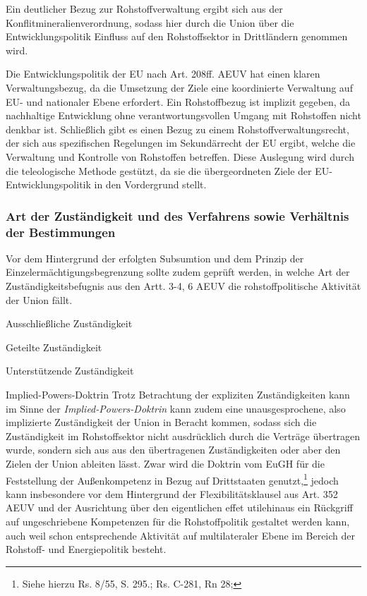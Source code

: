 \documentclass[12pt,a4paper,oneside]{book} %
\begin{document}
Ein deutlicher Bezug zur Rohstoffverwaltung ergibt sich aus der Konflitmineralienverordnung, sodass hier durch die Union über die Entwicklungspolitik Einfluss auf den Rohstoffsektor in Drittländern genommen wird.
	
Die Entwicklungspolitik der EU nach Art. 208ff. AEUV hat einen klaren Verwaltungsbezug, da die Umsetzung der Ziele eine koordinierte Verwaltung auf EU- und nationaler Ebene erfordert. Ein Rohstoffbezug ist implizit gegeben, da nachhaltige Entwicklung ohne verantwortungsvollen Umgang mit Rohstoffen nicht denkbar ist. Schließlich gibt es einen Bezug zu einem Rohstoffverwaltungsrecht, der sich aus spezifischen Regelungen im Sekundärrecht der EU ergibt, welche die Verwaltung und Kontrolle von Rohstoffen betreffen. Diese Auslegung wird durch die teleologische Methode gestützt, da sie die übergeordneten Ziele der EU-Entwicklungspolitik in den Vordergrund stellt.
	
\subsubsection{Art der Zuständigkeit und des Verfahrens sowie Verhältnis der Bestimmungen}

Vor dem Hintergrund der erfolgten Subsumtion und dem Prinzip der Einzelermächtigungsbegrenzung sollte zudem geprüft werden, in welche Art der Zuständigkeitsbefugnis aus den Artt. 3-4, 6 AEUV die rohstoffpolitische Aktivität der Union fällt.
	
Ausschließliche Zuständigkeit
	
Geteilte Zuständigkeit
	
Unterstützende Zuständigkeit
	
Implied-Powers-Doktrin
Trotz Betrachtung der expliziten Zuständigkeiten kann im Sinne der \textit{Implied-Powers-Doktrin} kann zudem eine unausgesprochene, also implizierte Zuständigkeit der Union in Beracht kommen, sodass sich die Zuständigkeit im Rohstoffsektor nicht ausdrücklich durch die Verträge übertragen wurde, sondern sich aus aus den übertragenen Zuständigkeiten oder aber den Zielen der Union ableiten lässt. Zwar wird die Doktrin vom EuGH für die Feststellung der Außenkompetenz in Bezug auf Drittstaaten genutzt,\footnote{Siehe hierzu Rs. 8/55, S. 295.; Rs. C-281, Rn 28; } jedoch kann insbesondere vor dem Hintergrund der Flexibilitätsklausel aus Art. 352 AEUV und der Ausrichtung über den eigentlichen \glqq effet utile\glqq hinaus\autocite{Callies/Ruffert, Art. 352 AEUV., Rn. 67} ein Rückgriff auf ungeschriebene Kompetenzen für die Rohstoffpolitik gestaltet werden kann, auch weil schon entsprechende Aktivität auf multilateraler Ebene im Bereich der Rohstoff- und Energiepolitik besteht.\autocites{EU 6 - 3000 - 025/24, S. 8}{Bungenberg, in: Pechstein/Nowak/Häde, Frankfurter Kommentar EUV/GRC/AEUV, 2. Auflage 2023, AEUV, Art. 207, Rn. 223.}
	
\end{document}
